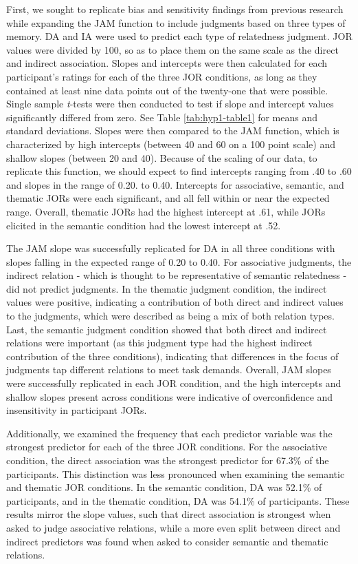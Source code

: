 \documentclass[english,,man]{apa6}
\begin{document}
First, we sought to replicate bias and sensitivity findings from previous research while expanding the JAM function to include judgments based on three types of memory. DA and IA were used to predict each type of relatedness judgment. JOR values were divided by 100, so as to place them on the same scale as the direct and indirect association. Slopes and intercepts were then calculated for each participant's ratings for each of the three JOR conditions, as long as they contained at least nine data points out of the twenty-one that were possible. Single sample \emph{t}-tests were then conducted to test if slope and intercept values significantly differed from zero. See Table \ref{tab:hyp1-table1} for means and standard deviations. Slopes were then compared to the JAM function, which is characterized by high intercepts (between 40 and 60 on a 100 point scale) and shallow slopes (between 20 and 40). Because of the scaling of our data, to replicate this function, we should expect to find intercepts ranging from .40 to .60 and slopes in the range of 0.20. to 0.40. Intercepts for associative, semantic, and thematic JORs were each significant, and all fell within or near the expected range. Overall, thematic JORs had the highest intercept at .61, while JORs elicited in the semantic condition had the lowest intercept at .52.

The JAM slope was successfully replicated for DA in all three conditions with slopes falling in the expected range of 0.20 to 0.40. For associative judgments, the indirect relation - which is thought to be representative of semantic relatedness - did not predict judgments. In the thematic judgment condition, the indirect values were positive, indicating a contribution of both direct and indirect values to the judgments, which were described as being a mix of both relation types. Last, the semantic judgment condition showed that both direct and indirect relations were important (as this judgment type had the highest indirect contribution of the three conditions), indicating that differences in the focus of judgments tap different relations to meet task demands. Overall, JAM slopes were successfully replicated in each JOR condition, and the high intercepts and shallow slopes present across conditions were indicative of overconfidence and insensitivity in participant JORs.

Additionally, we examined the frequency that each predictor variable was the strongest predictor for each of the three JOR conditions. For the associative condition, the direct association was the strongest predictor for 67.3\% of the participants. This distinction was less pronounced when examining the semantic and thematic JOR conditions. In the semantic condition, DA was 52.1\% of participants, and in the thematic condition, DA was 54.1\% of participants. These results mirror the slope values, such that direct association is strongest when asked to judge associative relations, while a more even split between direct and indirect predictors was found when asked to consider semantic and thematic relations.
\end{document}
